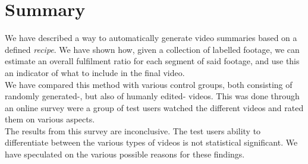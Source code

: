 \section{Summary}
%
We have described a way to automatically generate video summaries based on a defined \textit{recipe}. We have shown how, given a collection of labelled footage, we can estimate an overall fulfilment ratio for each segment of said footage, and use this an indicator of what to include in the final video.\\
We have compared this method with various control groups, both consisting of randomly generated-, but also of humanly edited- videos. This was done through an online survey were a group of test users watched the different videos and rated them on various aspects.\\
The results from this survey are inconclusive. The test users ability to differentiate between the various types of videos is not statistical significant. We have speculated on the various possible reasons for these findings.\\
